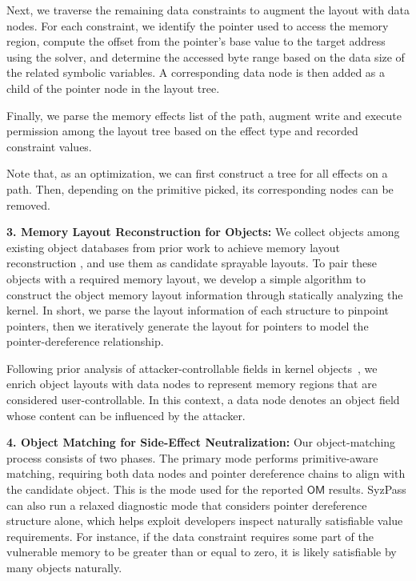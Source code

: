 Next, we traverse the remaining data constraints to augment the layout with data nodes. For each constraint, we identify the pointer used to access the memory region, compute the offset from the pointer’s base value to the target address using the solver, and determine the accessed byte range based on the data size of the related symbolic variables. A corresponding data node is then added as a child of the pointer node in the layout tree.

Finally, we parse the memory effects list of the path, augment write and execute permission among the layout tree based on the effect type and recorded constraint values.

Note that, as an optimization, we can first construct a tree for all effects on a path. Then, depending on the primitive picked, its corresponding nodes can be removed. 




\noindent\textbf{3. Memory Layout Reconstruction for Objects:} We collect objects among existing object databases from prior work to achieve memory layout reconstruction \cite{chen2019slake,chen2020systematic,wang2023alphaexp}, and use them as candidate sprayable layouts. To pair these objects with a required memory layout, we develop a simple algorithm to construct the object memory layout information through statically analyzing the kernel. In short, we parse the layout information of each structure to pinpoint pointers, then we iteratively generate the layout for pointers to model the pointer-dereference relationship. 

Following prior analysis of attacker-controllable fields in kernel objects~\cite{chen2020systematic}, we enrich object layouts with data nodes to represent memory regions that are considered user-controllable. In this context, a data node denotes an object field whose content can be influenced by the attacker. 


\noindent\textbf{4. Object Matching for Side-Effect Neutralization:} Our object-matching process consists of two phases. The primary mode performs primitive-aware matching, requiring both data nodes and pointer dereference chains to align with the candidate object. This is the mode used for the reported $\mathsf{OM}$ results. SyzPass can also run a relaxed diagnostic mode that considers pointer dereference structure alone, which helps exploit developers inspect naturally satisfiable value requirements. For instance, if the data constraint requires some part of the vulnerable memory to be greater than or equal to zero, it is likely satisfiable by many objects naturally.

